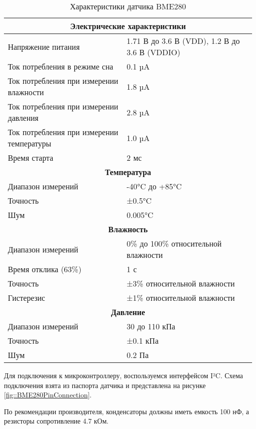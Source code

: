 \begin{table}[h!]
	\centering
	\begin{tabular}{| m{6cm} | m{10cm} |}
		\hline
		\multicolumn{2}{|c|}{\textbf{Электрические характеристики}} \\ \hline
		Напряжение питания & 1.71 В до 3.6 В (VDD), 1.2 В до 3.6 В (VDDIO) \\ \hline
		Ток потребления в режиме сна & 0.1 µA \\ \hline
		Ток потребления при измерении влажности & 1.8 µA \\ \hline
		Ток потребления при измерении давления & 2.8 µA \\ \hline
		Ток потребления при измерении температуры & 1.0 µA \\ \hline
		Время старта & 2 мс \\ \hline
		
		\multicolumn{2}{|c|}{\textbf{Температура}} \\ \hline
		Диапазон измерений & -40°C до +85°C \\ \hline
		Точность & ±0.5°C \\ \hline
		Шум & 0.005°C \\ \hline
		
		\multicolumn{2}{|c|}{\textbf{Влажность}} \\ \hline 
		Диапазон измерений & 0\% до 100\% относительной влажности \\ \hline
		Время отклика (63\%) & 1 с \\ \hline
		Точность & ±3\% относительной влажности \\ \hline
		Гистерезис & ±1\% относительной влажности \\ \hline
		
		\multicolumn{2}{|c|}{\textbf{Давление}} \\ \hline 
		Диапазон измерений & 30 до 110 кПа \\ \hline
		Точность & ±0.1 кПа \\ \hline
		Шум & 0.2 Па \\ \hline
		
	\end{tabular}
	\caption{Характеристики датчика BME280}
	\label{tab::TempSensorCharacteristics}
\end{table}

Для подключения к микроконтроллеру, воспользуемся интерфейсом I²C. Схема подключения взята из паспорта датчика \cite{} и представлена на рисунке \ref{fig::BME280PinConnection}.


По рекомендации производителя, конденсаторы должны иметь емкость 100 нФ, а резисторы сопротивление 4.7 кОм.
